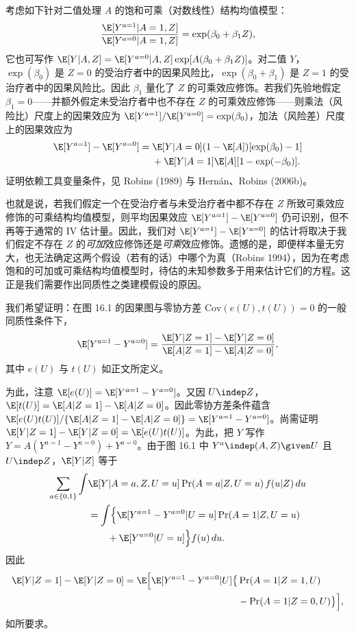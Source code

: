 \begin{techpoint}[可乘结构均值模型与 IV 估计]
考虑如下针对二值处理 $A$ 的饱和可乘（对数线性）结构均值模型：
\[
\frac{\E[Y^{a=1}|A=1,Z]}{\E[Y^{a=0}|A=1,Z]}=\exp(\beta_0+\beta_1 Z),
\]
它也可写作 $\E[Y|A,Z]=\E[Y^{a=0}|A,Z]\exp[A(\beta_0+\beta_1 Z)]$。对二值 $Y$，$\exp(\beta_0)$ 是 $Z=0$ 的受治疗者中的因果风险比，$\exp(\beta_0+\beta_1)$ 是 $Z=1$ 的受治疗者中的因果风险比。因此 $\beta_1$ 量化了 $Z$ 的可乘效应修饰。若我们先验地假定 $\beta_1=0$——并额外假定未受治疗者中也不存在 $Z$ 的可乘效应修饰——则乘法（风险比）尺度上的因果效应为 $\E[Y^{a=1}]/\E[Y^{a=0}]=\exp(\beta_0)$，加法（风险差）尺度上的因果效应为
\begin{align*}
\E[Y^{a=1}]-\E[Y^{a=0}]={}&\E[Y|A=0](1-\E[A])[\exp(\beta_0)-1]\\
&+\E[Y|A=1]\E[A][1-\exp(-\beta_0)].
\end{align*}
证明依赖工具变量条件，见 Robins (1989) 与 Hernán、Robins (2006b)。

也就是说，若我们假定一个在受治疗者与未受治疗者中都不存在 $Z$ 所致可乘效应修饰的可乘结构均值模型，则平均因果效应 $\E[Y^{a=1}]-\E[Y^{a=0}]$ 仍可识别，但不再等于通常的 IV 估计量。因此，我们对 $\E[Y^{a=1}]-\E[Y^{a=0}]$ 的估计将取决于我们假定不存在 $Z$ 的\emph{可加}效应修饰还是\emph{可乘}效应修饰。遗憾的是，即便样本量无穷大，也无法确定这两个假设（若有的话）中哪个为真（Robins 1994），因为在考虑饱和的可加或可乘结构均值模型时，待估的未知参数多于用来估计它们的方程。这正是我们需要作出同质性之类建模假设的原因。
\end{techpoint}

\begin{techpoint}[一般同质性条件的证明]
我们希望证明：在图 16.1 的因果图与零协方差 $\mathrm{Cov}(e(U),t(U))=0$ 的一般同质性条件下，
{\footnotesize
\[
\E[Y^{a=1}-Y^{a=0}]=\frac{\E[Y|Z=1]-\E[Y|Z=0]}{\E[A|Z=1]-\E[A|Z=0]},
\]}
其中 $e(U)$ 与 $t(U)$ 如正文所定义。

为此，注意 $\E[e(U)]=\E[Y^{a=1}-Y^{a=0}]$。又因 $U\indep Z$，$\E[t(U)]=\E[A|Z=1]-\E[A|Z=0]$。因此零协方差条件蕴含 $\E[e(U)t(U)]/\{\E[A|Z=1]-\E[A|Z=0]\}=\E[Y^{a=1}-Y^{a=0}]$。尚需证明 $\E[Y|Z=1]-\E[Y|Z=0]=\E[e(U)t(U)]$。为此，把 $Y$ 写作 $Y=A(Y^{a=1}-Y^{a=0})+Y^{a=0}$。由于图 16.1 中 $Y^{a}\indep(A,Z)\given U$ 且 $U\indep Z$，$\E[Y|Z]$ 等于
\begin{align*}
\sum_{a\in\{0,1\}}\int &\E[Y|A=a,Z,U=u]\Pr(A=a|Z,U=u)\,f(u|Z)\,du\\
&=\int\Bigl\{\E[Y^{a=1}-Y^{a=0}|U=u]\Pr(A=1|Z,U=u)\\
&\qquad+\E[Y^{a=0}|U=u]\Bigr\}f(u)\,du.
\end{align*}
因此
\begin{align*}
\E[Y|Z=1]-\E[Y|Z=0]=\E\Bigl[\E[Y^{a=1}-Y^{a=0}|U]\bigl\{&\Pr(A=1|Z=1,U)\\
&-\Pr(A=1|Z=0,U)\bigr\}\Bigr],
\end{align*}
如所要求。
\end{techpoint}

